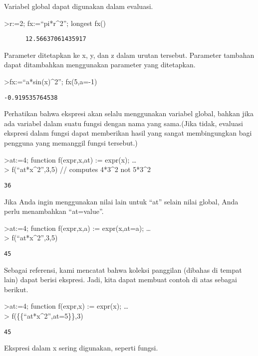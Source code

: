 \documentclass[
]{book}
\begin{document}
Variabel global dapat digunakan dalam evaluasi.

\textgreater r:=2; fx:=``pi*r\^{}2''; longest fx()

\begin{verbatim}
      12.56637061435917 
\end{verbatim}

Parameter ditetapkan ke x, y, dan z dalam urutan tersebut. Parameter tambahan dapat ditambahkan menggunakan parameter yang ditetapkan.

\textgreater fx:=``a*sin(x)\^{}2''; fx(5,a=-1)

\begin{verbatim}
-0.919535764538
\end{verbatim}

Perhatikan bahwa ekspresi akan selalu menggunakan variabel global, bahkan jika ada variabel dalam suatu fungsi dengan nama yang sama.(Jika tidak, evaluasi ekspresi dalam fungsi dapat memberikan hasil yang sangat membingungkan bagi pengguna yang memanggil fungsi tersebut.)

\textgreater at:=4; function f(expr,x,at) := expr(x); \ldots{}\\
\textgreater{} f(``at*x\^{}2'',3,5) // computes 4*3\^{}2 not 5*3\^{}2

\begin{verbatim}
36
\end{verbatim}

Jika Anda ingin menggunakan nilai lain untuk ``at'' selain nilai global, Anda perlu menambahkan ``at=value''.

\textgreater at:=4; function f(expr,x,a) := expr(x,at=a); \ldots{}\\
\textgreater{} f(``at*x\^{}2'',3,5)

\begin{verbatim}
45
\end{verbatim}

Sebagai referensi, kami mencatat bahwa koleksi panggilan (dibahas di tempat lain) dapat berisi ekspresi. Jadi, kita dapat membuat contoh di atas sebagai berikut.

\textgreater at:=4; function f(expr,x) := expr(x); \ldots{}\\
\textgreater{} f(\{\{``at*x\^{}2'',at=5\}\},3)

\begin{verbatim}
45
\end{verbatim}

Ekspresi dalam x sering digunakan, seperti fungsi.
\end{document}

